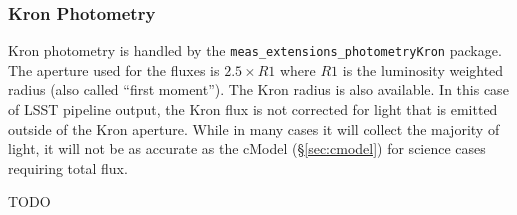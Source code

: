 \subsubsection{Kron Photometry}
\label{sec:kron}

Kron photometry \citep{1980ApJS...43..305K} is handled by the \texttt{meas\_extensions\_photometryKron} package.
The aperture used for the fluxes is $2.5 \times R1$ where $R1$ is the luminosity weighted radius (also called ``first moment'').
The Kron radius is also available.
In this case of LSST pipeline output, the Kron flux is not corrected for light that is emitted outside of the Kron aperture.
While in many cases it will collect the majority of light, it will not be as accurate as the cModel (\S\ref{sec:cmodel}) for science cases requiring total flux.

TODO
